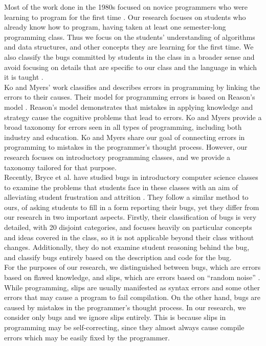\documentclass{sig-alternate}
\begin{document}
Most of the work done in the 1980s focused on novice programmers who were learning to program for the first time \cite{Pea86, SpohrerSoloway86}. Our research focuses on students who already know how to program, having taken at least one semester-long programming class. Thus we focus on the students' understanding of algorithms and data structures, and other concepts they are learning for the first time. We also classify the bugs committed by students in the class in a broader sense and avoid focusing on details that are specific to our class and the language in which it is taught \cite{Arnold10}.\\

Ko and Myers' work \cite{KoMyers03} classifies and describes errors in programming by linking the errors to their causes. Their model for programming errors is based on Reason's model \cite{Reason90}. Reason's model demonstrates that mistakes in applying knowledge and strategy cause the cognitive problems that lead to errors. Ko and Myers provide a broad taxonomy for errors seen in all types of programming, including both industry and education. Ko and Myers share our goal of connecting errors in programming to mistakes in the programmer's thought process. However, our research focuses on introductory programming classes, and we provide a taxonomy tailored for that purpose.\\

Recently, Bryce et al. have studied bugs in introductory computer science classes to examine the problems that students face in these classes with an aim of alleviating student frustration and attrition \cite{BryceCooleyHansenHayrapetyan10}. They follow a similar method to ours, of asking students to fill in a form reporting their bugs, yet they differ from our research in two important aspects. Firstly, their classification of bugs is very detailed, with 20 disjoint categories, and focuses heavily on particular concepts and ideas covered in the class, so it is not applicable beyond their class without changes. Additionally, they do not examine student reasoning behind the bug, and classify bugs entirely based on the description and code for the bug.\\

For the purposes of our research, we distinguished between bugs, which are errors based on flawed knowledge, and slips, which are errors based on ``random noise'' \cite{VanLehn90}. While programming, slips are usually manifested as syntax errors and some other errors that may cause a program to fail compilation. On the other hand, bugs are caused by mistakes in the programmer's thought process. In our research, we consider only bugs and we ignore slips entirely. This is because slips in programming may be self-correcting, since they almost always cause compile errors which may be easily fixed by the programmer.\\
\end{document}
